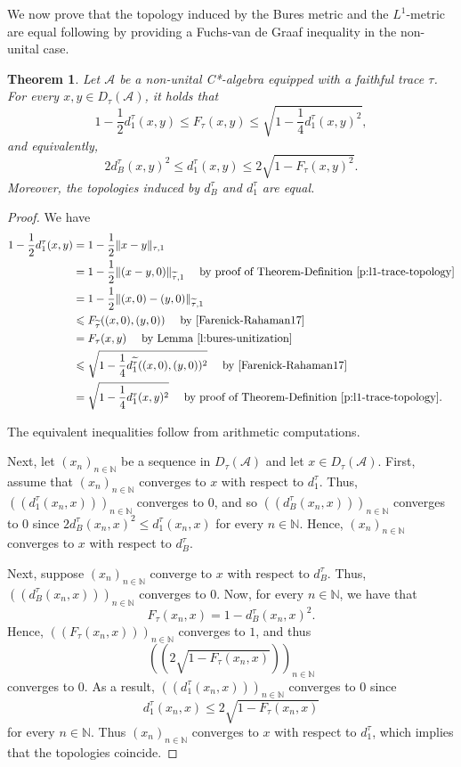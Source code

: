 \documentclass{amsart}
\theoremstyle{plain}
\newtheorem{theorem}{Theorem}[section]
\theoremstyle{definition}
\theoremstyle{remark}
\numberwithin{equation}{section}
\newcommand{\A}{{\mathcal{A}}}
\newcommand{\wt}[1]{{\widetilde{#1}}}
\newcommand{\N}{{\mathds{N}}}
\renewcommand{\leq}{\leqslant}
\begin{document}
We now prove that the topology induced by the Bures metric and the $L^1$-metric are equal following \cite[Proposition 2.7]{Farenick-Rahaman17} by providing a Fuchs-van de Graaf inequality in the non-unital case.

\begin{theorem}\label{t:l1-homeo}
    Let $\A$ be a non-unital C*-algebra equipped with a faithful trace $\tau$. For every $x,y\in D_\tau(\A)$, it holds that 
    \[
    1-\frac{1}{2}d_1^\tau(x,y)\leq F_\tau(x,y) \leq \sqrt{1-\frac{1}{4}d_1^\tau( x,y)^2}, 
    \]
    and equivalently,
    \[
    2d_B^\tau(x,y)^2\leq d_1^\tau(x,y)\leq 2\sqrt{1-F_\tau(x,y)^2}.
    \]
    Moreover, the topologies induced by $d_B^\tau$ and $d_1^\tau$ are equal.
\end{theorem}
\begin{proof}
    We have
    \begin{align*}
         1-\frac{1}{2}d_1^\tau(x,y)& =  1-\frac{1}{2}\|x-y\|_{\tau,1}\\
         & = 1-\frac{1}{2}\|(x-y, 0)\|_{\wt{\tau},1} \quad \text{ by proof of Theorem-Definition \ref{p:l1-trace-topology}}\\
         & = 1-\frac{1}{2}\|(x, 0)-(y, 0)\|_{\wt{\tau},1}\\
         & \leq F_{\wt{\tau}}((x,0),(y,0)) \quad \text{ by \cite[Proposition 2.7]{Farenick-Rahaman17}}\\
         & =F_\tau(x,y) \quad \text{ by Lemma \ref{l:bures-unitization}}\\
         & \leq \sqrt{1-\frac{1}{4}d_1^{\wt{\tau}}( (x,0),(y,0))^2} \quad \text{ by \cite[Proposition 2.7]{Farenick-Rahaman17}}\\
         & = \sqrt{1-\frac{1}{4}d_1^\tau( x,y)^2} \quad \text{ by proof of Theorem-Definition \ref{p:l1-trace-topology}}.
    \end{align*}


    The equivalent inequalities follow  from arithmetic computations.

    Next, let $(x_n)_{n\in \N}$ be a sequence in $D_\tau(\A)$ and let $x\in D_\tau(\A)$.  First, assume that $(x_n)_{n\in \N}$ converges to $x$ with respect to $d_1^\tau$. Thus,  $((d_1^\tau(x_n,x)))_{n\in \N}$ converges to $0$, and so $((d_B^\tau(x_n,x)))_{n\in \N}$ converges to $0$ since  $2d_B^\tau(x_n,x)^2\leq d_1^\tau(x_n,x) $ for every $n\in \N$. Hence,  $(x_n)_{n\in \N}$ converges to $x$ with respect to $d_B^\tau$.

    Next, suppose  $(x_n)_{n\in \N}$ converge to $x$ with respect to $d_B^\tau$. Thus,  $((d_B^\tau(x_n,x)))_{n\in \N}$ converges to $0$. Now, for every $n\in \N$, we have that 
    \[
    F_\tau(x_n,x)=1-d_B^\tau(x_n,x)^2.
    \]
    Hence, $((F_\tau(x_n,x)))_{n\in \N}$ converges to $1$, and thus 
    \[
    \left( \left( 2\sqrt{1-F_\tau(x_n,x)}\right)\right)_{n\in \N}
    \]
    converges to $0$. As a result,  $((d_1^\tau(x_n,x)))_{n\in \N}$ converges to $0$ since  \[d_1^\tau(x_n,x)\leq 2\sqrt{1-F_\tau(x_n,x)}\] for every $n\in \N$. Thus $(x_n)_{n\in \N}$ converges to $x$ with respect to $d_1^\tau$, which implies that the topologies coincide.
\end{proof}
\end{document}
